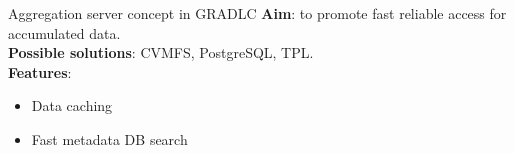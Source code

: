

\begin{frame}{Aggregation server concept in GRADLC}
\textbf{Aim}: to promote fast reliable access for accumulated data.
\vspace{\itemsep}\\
\textbf{Possible solutions}: CVMFS, PostgreSQL, TPL.
\vspace{\itemsep}\\
\textbf{Features}:
  \begin{itemize}
    \item Data caching
    \item Fast metadata DB search
  \end{itemize}
\end{frame}

